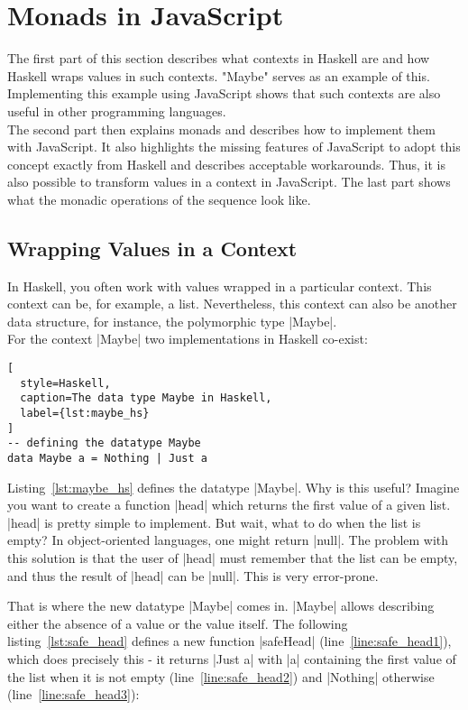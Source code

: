 \chapter{Monads in JavaScript} %
\label{chap:Monads in JavaScript}
The first part of this section describes what contexts in Haskell are and how
Haskell wraps values in such contexts. "Maybe" serves as an example of this.
Implementing this example using JavaScript shows that such contexts are also
useful in other programming languages.\\
The second part then explains monads and describes how to implement them with JavaScript.
It also highlights the missing features of JavaScript to adopt
this concept exactly from Haskell and describes acceptable workarounds. Thus, it
is also possible to transform values in a context in JavaScript. The
last part shows what the monadic operations of the sequence look like.

\section{Wrapping Values in a Context} %
\label{sec:Wrapping values in a context}
In Haskell, you often work with values wrapped in a particular context. This
context can be, for example, a list. Nevertheless, this context can also be
another data structure, for instance, the polymorphic type |Maybe|. \\
For the context |Maybe| two implementations in Haskell co-exist:

\begin{lstlisting}[
  style=Haskell,
  caption=The data type Maybe in Haskell,
  label={lst:maybe_hs}
]
-- defining the datatype Maybe
data Maybe a = Nothing | Just a
\end{lstlisting}

Listing~\ref{lst:maybe_hs} defines the datatype |Maybe|. Why is this useful?
Imagine you want to create a function |head| which returns the first value of
a given list. |head| is pretty simple to implement. But wait, what to do when
the list is empty? In object-oriented languages, one might return |null|. The
problem with this solution is that the user of |head| must remember that the
list can be empty, and thus the result of |head| can be |null|. This is very
error-prone.

That is where the new datatype |Maybe| comes in. |Maybe| allows describing
either the absence of a value or the value itself. The following
listing~\ref{lst:safe_head} defines a new function |safeHead|
(line~\ref{line:safe_head1}), which does precisely this - it returns |Just a|
with |a| containing the first value of the list when it is not empty
(line~\ref{line:safe_head2}) and |Nothing| otherwise (line~\ref{line:safe_head3}):

